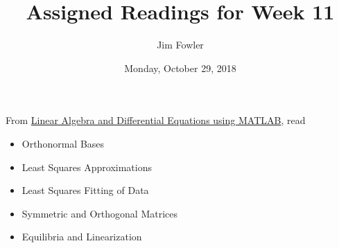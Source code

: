 \documentclass{homework}
\author{Jim Fowler}
\title{Assigned Readings for Week 11}
\date{Monday, October 29, 2018}
\begin{document}
\maketitle

From \href{/courses/43735/files/folder/textbooks}{Linear Algebra and Differential Equations using MATLAB}, read 
\begin{itemize}
\item {} Orthonormal Bases
\item {} Least Squares Approximations
\item {} Least Squares Fitting of Data
\item {} Symmetric and Orthogonal Matrices
\item {} Equilibria and Linearization
\end{itemize}
\end{document}
